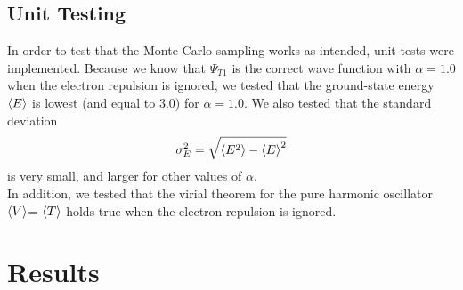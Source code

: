 \documentclass[10pt,a4paper]{article}
\begin{document}
\subsection{Unit Testing}
In order to test that the Monte Carlo sampling works as intended, unit tests were implemented. Because we know that $\Psi_{T1}$ is the correct wave function with $\alpha=1.0$ when the electron repulsion is ignored, we tested that the ground-state energy $\braket{E}$ is lowest (and equal to 3.0) for $\alpha=1.0$. We also tested that the standard deviation
\begin{equation}
\sigma_E^2 = \sqrt{\braket{E^2}-\braket{E}^2}
\end{equation}
is very small, and larger for other values of $\alpha$. \\
In addition, we tested that the virial theorem for the pure harmonic oscillator  $\braket{V}$= $\braket{T}$ holds true when the electron repulsion is ignored.
\section{Results}
\end{document}
